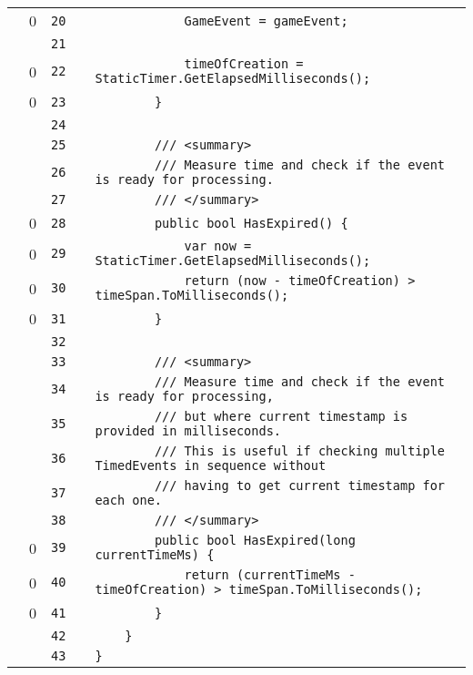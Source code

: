 \documentclass[a4paper,landscape,10pt]{article}
\begin{document}
\begin{longtable}[l]{lrrll}
\cellcolor{red} & 0 & \verb~20~ & & \verb~            GameEvent = gameEvent;~\\
\cellcolor{gray} &  & \verb~21~ & & \verb~~\\
\cellcolor{red} & 0 & \verb~22~ & & \verb~            timeOfCreation = StaticTimer.GetElapsedMilliseconds();~\\
\cellcolor{red} & 0 & \verb~23~ & & \verb~        }~\\
\cellcolor{gray} &  & \verb~24~ & & \verb~~\\
\cellcolor{gray} &  & \verb~25~ & & \verb~        /// <summary>~\\
\cellcolor{gray} &  & \verb~26~ & & \verb~        /// Measure time and check if the event is ready for processing.~\\
\cellcolor{gray} &  & \verb~27~ & & \verb~        /// </summary>~\\
\cellcolor{red} & 0 & \verb~28~ & & \verb~        public bool HasExpired() {~\\
\cellcolor{red} & 0 & \verb~29~ & & \verb~            var now = StaticTimer.GetElapsedMilliseconds();~\\
\cellcolor{red} & 0 & \verb~30~ & & \verb~            return (now - timeOfCreation) > timeSpan.ToMilliseconds();~\\
\cellcolor{red} & 0 & \verb~31~ & & \verb~        }~\\
\cellcolor{gray} &  & \verb~32~ & & \verb~~\\
\cellcolor{gray} &  & \verb~33~ & & \verb~        /// <summary>~\\
\cellcolor{gray} &  & \verb~34~ & & \verb~        /// Measure time and check if the event is ready for processing,~\\
\cellcolor{gray} &  & \verb~35~ & & \verb~        /// but where current timestamp is provided in milliseconds.~\\
\cellcolor{gray} &  & \verb~36~ & & \verb~        /// This is useful if checking multiple TimedEvents in sequence without~\\
\cellcolor{gray} &  & \verb~37~ & & \verb~        /// having to get current timestamp for each one.~\\
\cellcolor{gray} &  & \verb~38~ & & \verb~        /// </summary>~\\
\cellcolor{red} & 0 & \verb~39~ & & \verb~        public bool HasExpired(long currentTimeMs) {~\\
\cellcolor{red} & 0 & \verb~40~ & & \verb~            return (currentTimeMs - timeOfCreation) > timeSpan.ToMilliseconds();~\\
\cellcolor{red} & 0 & \verb~41~ & & \verb~        }~\\
\cellcolor{gray} &  & \verb~42~ & & \verb~    }~\\
\cellcolor{gray} &  & \verb~43~ & & \verb~}~\\
\end{longtable}
\newpage
\end{document}
